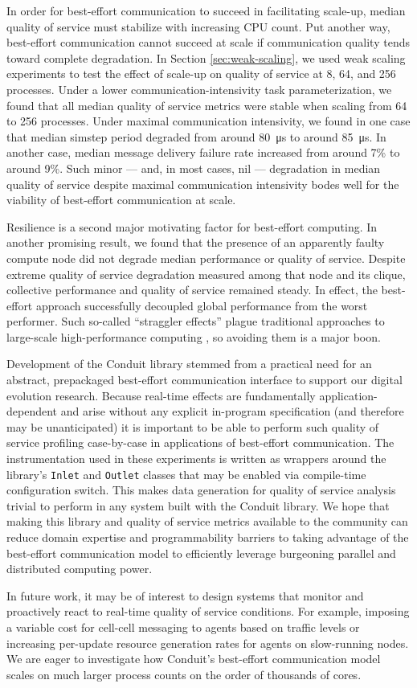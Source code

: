 In order for best-effort communication to succeed in facilitating scale-up, median quality of service must stabilize with increasing CPU count.
Put another way, best-effort communication cannot succeed at scale if communication quality tends toward complete degradation.
In Section \ref{sec:weak-scaling}, we used weak scaling experiments to test the effect of scale-up on quality of service at 8, 64, and 256 processes.
Under a lower communication-intensivity task parameterization, we found that all median quality of service metrics were stable when scaling from 64 to 256 processes.
Under maximal communication intensivity, we found in one case that median simstep period degraded from around \SI{80}{\micro\second} to around \SI{85}{\micro\second}.
In another case, median message delivery failure rate increased from around 7\% to around 9\%.
Such minor --- and, in most cases, nil --- degradation in median quality of service despite maximal communication intensivity bodes well for the viability of best-effort communication at scale.

Resilience is a second major motivating factor for best-effort computing.
In another promising result, we found that the presence of an apparently faulty compute node did not degrade median performance or quality of service.
Despite extreme quality of service degradation measured among that node and its clique, collective performance and quality of service remained steady.
In effect, the best-effort approach successfully decoupled global performance from the worst performer.
Such so-called ``straggler effects'' plague traditional approaches to large-scale high-performance computing \citep{aktacs2019straggler}, so avoiding them is a major boon.

Development of the Conduit library stemmed from a practical need for an abstract, prepackaged best-effort communication interface to support our digital evolution research.
Because real-time effects are fundamentally application-dependent and arise without any explicit in-program specification (and therefore may be unanticipated) it is important to be able to perform such quality of service profiling case-by-case in applications of best-effort communication.
The instrumentation used in these experiments is written as wrappers around the library's \texttt{Inlet} and \texttt{Outlet} classes that may be enabled via compile-time configuration switch.
This makes data generation for quality of service analysis trivial to perform in any system built with the Conduit library.
We hope that making this library and quality of service metrics available to the community can reduce domain expertise and programmability barriers to taking advantage of the best-effort communication model to efficiently leverage burgeoning parallel and distributed computing power.

In future work, it may be of interest to design systems that monitor and proactively react to real-time quality of service conditions.
For example, imposing a variable cost for cell-cell messaging to agents based on traffic levels or increasing per-update resource generation rates for agents on slow-running nodes.
We are eager to investigate how Conduit's best-effort communication model scales on much larger process counts on the order of thousands of cores.
